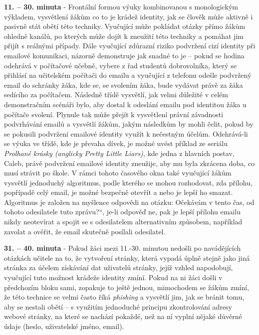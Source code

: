 \documentclass[a4paper, 12pt]{article}
\providecommand{\uv}[1]{\quotedblbase #1\textquotedblleft}
\begin{document}
\textbf{11. -- 30. minuta} - Frontální formou výuky kombinovanou s monologickým výkladem, vysvětlení žákům co to je krádež identity, jak se člověk může aktivně i pasivně stát obětí této techniky. Vyučující může pokládat otázky přímo žákům ohledně kanálů, po kterých může dojít k zneužití této techniky a pomáhat jim přijít s reálnými případy. Dále vyučující zdůrazní riziko podvržení cizí identity při emailové komunikaci, názorně demonstruje jak snadné to je -- pokud se hodina odehrává v počítačové učebně, vybere z řad studentů dobrovolníka, který se přihlásí na učitelském počítači do emailu a vyučující z telefonu odešle podvržený email do schránky žáka, kde se, se svolením žáka, bude vydávat právě za žáka sedícího za počítačem. Následně třídě vysvětlí, jak velmi důležité v celém demonstračním scénáři bylo, aby dostal k odeslání emailu pod identitou žáka u počítače svolení. Plynule tak může přejít k vysvětlení právní závadnosti podvrhávání emailů a vysvětlí žákům, jakým následkům by mohli čelit, pokud by se pokusili podvržení emailové identity využít k nečestným účelům. Odehrává-li se výuka ve třídě, kde je převaha dívek, je možné uvést příklad ze seriálu \textit{Prolhané krásky (anglicky Pretty Little Liars)}, kde jedna z hlavních postav, Caleb, právě podvržení emailové identity zneužije, aby mu byla zkrácena doba, co musí strávit po škole. V rámci tohoto časového okna také vyučující žákům vysvětlí jednoduchý algoritmus, podle kterého se mohou rozhodovat, zda přílohu, popřípadě celý email, je možné bezpečně otevřít a nebo je lepší ho smazat. Algoritmus je založen na myšlence odpovědi na otázku: \uv{Očekávám v tento čas, od tohoto odesilatele tuto zprávu?}, je-li odpověď ne, pak je lepší přílohu emailu nikdy neotevírat a spojit se s odesilatelem alternativním způsobem, například zavolat a ověřit, že email skutečně posílali odesilatel.

\textbf{31. -- 40. minuta} - Pokud žáci mezi 11.-30. minutou nedošli po navádějících otázkách učitele na to, že vytvoření stránky, která vypadá úplně stejně jako jiná stránka za účelem získávání dat uživatelů stránky, jejíž vzhled napodobují, vyučující tuto možnost krádeže identity zmíní. Pokud na ni žáci došli v předchozím bloku sami, zopakuje to ještě jednou, mimochodem se žákům zmíní, že této technice se velmi často říká \textit{phishing} a vysvětlí jim, jak se bránit tomu, aby se nestali obětí -- s využitím jednoduché principu zkontrolování adresy webové stránky, na které se nachází pokaždé, než na ní vyplní nějaké důvěrné údaje (heslo, uživatelské jméno, email).
\end{document}
